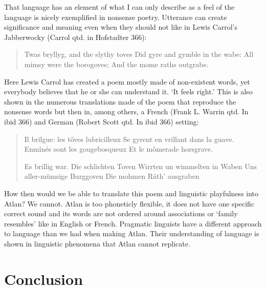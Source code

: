 That language has an element of what I can only describe as a feel of the language is nicely exemplified in nonsense poetry. Utterance can create significance and meaning even when they should not like in Lewis Carrol’s Jabberwocky (Carrol qtd. in Hofstadter 366):

\begin{quote}
Twas bryllyg, and the slythy toves 
 Did gyre and gymble in the wabe: 
 All mimsy were the borogoves; 
 And the mome raths outgrabe.  
\end{quote}

\noindent Here Lewis Carrol has created a poem mostly made of non-existent words, yet everybody believes that he or she can understand it. ‘It feels right.’ This is also shown in the numerous translations made of the poem that reproduce the nonsense words but then in, among others, a French (Frank L. Warrin qtd. In ibid 366) and German (Robert Scott qtd. In ibid 366) setting: 

\begin{quote}
Il brilgue: les t\^{o}ves lubricilleux 
Se gyrent en vrillant dans la guave. 
Enm\^{i}n\'{e}s sont les gougebosqueux 
Et le m\^{o}merade horsgrave.  

Es brillig war. Die schlichten Toven 
Wirrten un wimmelten in Waben 
Uns aller-m\"{u}msige Burggoven 
Die mohmen R\"{a}th’ ausgraben 
\end{quote}

\noindent How then would we be able to translate this poem and linguistic playfulness into Atlan? We cannot. Atlan is too phoneticly flexible, it does not have one specific correct sound and its words are not ordered around  associations or ‘family resembles’ like in English or French. Pragmatic linguists have a different approach to language than we had when making Atlan. Their understanding of language is shown in linguistic phenomena that Atlan cannot replicate.   

\section{Conclusion}


